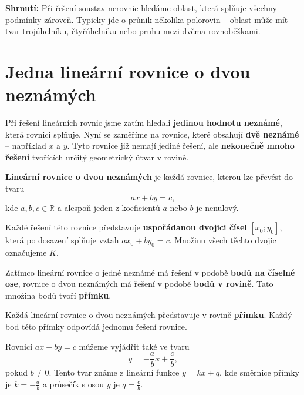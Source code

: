 \documentclass[12pt,a4paper]{article}
\begin{document}
\begin{notebox}
\textbf{Shrnutí:}  
Při řešení soustav nerovnic hledáme oblast, která splňuje všechny podmínky zároveň.  
Typicky jde o průnik několika polorovin – oblast může mít tvar trojúhelníku, čtyřúhelníku nebo pruhu mezi dvěma rovnoběžkami.
\end{notebox}


\newpage
\section{Jedna lineární rovnice o dvou neznámých}

Při řešení lineárních rovnic jsme zatím hledali \textbf{jedinou hodnotu neznámé}, která rovnici splňuje.  
Nyní se zaměříme na rovnice, které obsahují \textbf{dvě neznámé} – například \(x\) a \(y\).  
Tyto rovnice již nemají jediné řešení, ale \textbf{nekonečně mnoho řešení} tvořících určitý geometrický útvar v rovině.

\begin{definitionbox}
\textbf{Lineární rovnice o dvou neznámých} je každá rovnice, kterou lze převést do tvaru
\[
a x + b y = c,
\]
kde \(a, b, c \in \mathbb{R}\) a alespoň jeden z koeficientů \(a\) nebo \(b\) je nenulový.
\end{definitionbox}

Každé řešení této rovnice představuje \textbf{uspořádanou dvojici čísel} \([x_0; y_0]\), která po dosazení splňuje vztah \(a x_0 + b y_0 = c\).  
Množinu všech těchto dvojic označujeme \(K\).

\medskip
Zatímco lineární rovnice o jedné neznámé má řešení v podobě \textbf{bodů na číselné ose},  
rovnice o dvou neznámých má řešení v podobě \textbf{bodů v rovině}.  
Tato množina bodů tvoří \textbf{přímku}.

\begin{notebox}
Každá lineární rovnice o dvou neznámých představuje v rovině \textbf{přímku}.  
Každý bod této přímky odpovídá jednomu řešení rovnice.
\end{notebox}

\medskip
Rovnici \(a x + b y = c\) můžeme vyjádřit také ve tvaru
\[
y = -\frac{a}{b}x + \frac{c}{b},
\]
pokud \(b \neq 0\). Tento tvar známe z lineární funkce \(y = kx + q\),  
kde směrnice přímky je \(k = -\frac{a}{b}\) a průsečík s osou \(y\) je \(q = \frac{c}{b}\).
\end{document}

